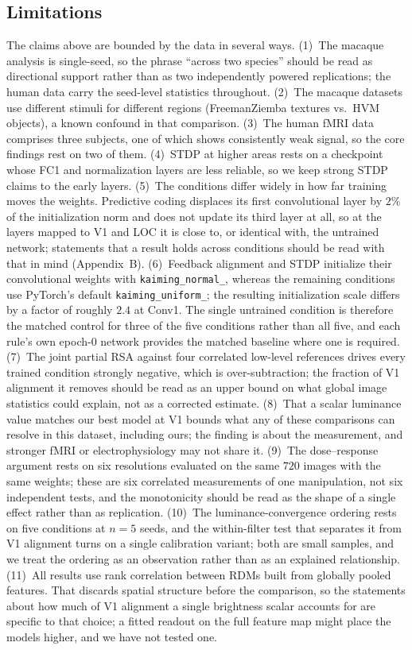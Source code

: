 \documentclass[10pt,twocolumn]{article}
\begin{document}
\subsection{Limitations}

The claims above are bounded by the data in several ways. (1)~The macaque analysis is single-seed, so the phrase ``across two species'' should be read as directional support rather than as two independently powered replications; the human data carry the seed-level statistics throughout. (2)~The macaque datasets use different stimuli for different regions (FreemanZiemba textures vs.\ HVM objects), a known confound in that comparison. (3)~The human fMRI data comprises three subjects, one of which shows consistently weak signal, so the core findings rest on two of them. (4)~STDP at higher areas rests on a checkpoint whose FC1 and normalization layers are less reliable, so we keep strong STDP claims to the early layers. (5)~The conditions differ widely in how far training moves the weights. Predictive coding displaces its first convolutional layer by $2\%$ of the initialization norm and does not update its third layer at all, so at the layers mapped to V1 and LOC it is close to, or identical with, the untrained network; statements that a result holds across conditions should be read with that in mind (Appendix~B). (6)~Feedback alignment and STDP initialize their convolutional weights with \texttt{kaiming\_normal\_}, whereas the remaining conditions use PyTorch's default \texttt{kaiming\_uniform\_}; the resulting initialization scale differs by a factor of roughly $2.4$ at Conv1. The single untrained condition is therefore the matched control for three of the five conditions rather than all five, and each rule's own epoch-$0$ network provides the matched baseline where one is required. (7)~The joint partial RSA against four correlated low-level references drives every trained condition strongly negative, which is over-subtraction; the fraction of V1 alignment it removes should be read as an upper bound on what global image statistics could explain, not as a corrected estimate. (8)~That a scalar luminance value matches our best model at V1 bounds what any of these comparisons can resolve in this dataset, including ours; the finding is about the measurement, and stronger fMRI or electrophysiology may not share it. (9)~The dose--response argument rests on six resolutions evaluated on the same $720$ images with the same weights; these are six correlated measurements of one manipulation, not six independent tests, and the monotonicity should be read as the shape of a single effect rather than as replication. (10)~The luminance-convergence ordering rests on five conditions at $n=5$ seeds, and the within-filter test that separates it from V1 alignment turns on a single calibration variant; both are small samples, and we treat the ordering as an observation rather than as an explained relationship. (11)~All results use rank correlation between RDMs built from globally pooled features. That discards spatial structure before the comparison, so the statements about how much of V1 alignment a single brightness scalar accounts for are specific to that choice; a fitted readout on the full feature map might place the models higher, and we have not tested one.
\end{document}
